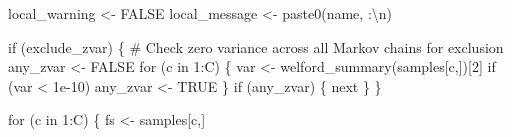 \documentclass[
  letterpaper,
  DIV=11,
  numbers=noendperiod]{scrartcl}
\newenvironment{Shaded}{\begin{snugshade}}{\end{snugshade}}
\newcommand{\CommentTok}[1]{\textcolor[rgb]{0.37,0.37,0.37}{#1}}
\newcommand{\ConstantTok}[1]{\textcolor[rgb]{0.56,0.35,0.01}{#1}}
\newcommand{\ControlFlowTok}[1]{\textcolor[rgb]{0.00,0.23,0.31}{#1}}
\newcommand{\DecValTok}[1]{\textcolor[rgb]{0.68,0.00,0.00}{#1}}
\newcommand{\FloatTok}[1]{\textcolor[rgb]{0.68,0.00,0.00}{#1}}
\newcommand{\FunctionTok}[1]{\textcolor[rgb]{0.28,0.35,0.67}{#1}}
\newcommand{\NormalTok}[1]{\textcolor[rgb]{0.00,0.23,0.31}{#1}}
\newcommand{\OtherTok}[1]{\textcolor[rgb]{0.00,0.23,0.31}{#1}}
\newcommand{\SpecialCharTok}[1]{\textcolor[rgb]{0.37,0.37,0.37}{#1}}
\newcommand{\StringTok}[1]{\textcolor[rgb]{0.13,0.47,0.30}{#1}}
\begin{document}
\begin{Shaded}
\begin{Highlighting}[]
\NormalTok{    local\_warning }\OtherTok{\textless{}{-}} \ConstantTok{FALSE}
\NormalTok{    local\_message }\OtherTok{\textless{}{-}} \FunctionTok{paste0}\NormalTok{(name, }\StringTok{\textquotesingle{}:}\SpecialCharTok{\textbackslash{}n}\StringTok{\textquotesingle{}}\NormalTok{)}
  
    \ControlFlowTok{if}\NormalTok{ (exclude\_zvar) \{}
      \CommentTok{\# Check zero variance across all Markov chains for exclusion}
\NormalTok{      any\_zvar }\OtherTok{\textless{}{-}} \ConstantTok{FALSE}
      \ControlFlowTok{for}\NormalTok{ (c }\ControlFlowTok{in} \DecValTok{1}\SpecialCharTok{:}\NormalTok{C) \{}
\NormalTok{        var }\OtherTok{\textless{}{-}} \FunctionTok{welford\_summary}\NormalTok{(samples[c,])[}\DecValTok{2}\NormalTok{]}
        \ControlFlowTok{if}\NormalTok{ (var }\SpecialCharTok{\textless{}} \FloatTok{1e{-}10}\NormalTok{)}
\NormalTok{          any\_zvar }\OtherTok{\textless{}{-}} \ConstantTok{TRUE}
\NormalTok{      \}}
      \ControlFlowTok{if}\NormalTok{ (any\_zvar) \{}
        \ControlFlowTok{next}
\NormalTok{      \}}
\NormalTok{    \}}
  
    \ControlFlowTok{for}\NormalTok{ (c }\ControlFlowTok{in} \DecValTok{1}\SpecialCharTok{:}\NormalTok{C) \{}
\NormalTok{      fs }\OtherTok{\textless{}{-}}\NormalTok{ samples[c,]}
      

\end{Highlighting}
\end{Shaded}
\end{document}
